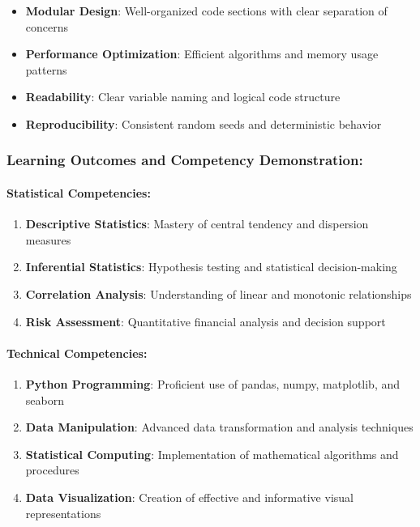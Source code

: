 \documentclass[11pt]{article}
\providecommand{\tightlist}{%
      \setlength{\itemsep}{0pt}\setlength{\parskip}{0pt}}
\begin{document}
\begin{itemize}
\tightlist
\item
  \textbf{Modular Design}: Well-organized code sections with clear
  separation of concerns
\item
  \textbf{Performance Optimization}: Efficient algorithms and memory
  usage patterns
\item
  \textbf{Readability}: Clear variable naming and logical code structure
\item
  \textbf{Reproducibility}: Consistent random seeds and deterministic
  behavior
\end{itemize}

\subsubsection{\texorpdfstring{\textbf{Learning Outcomes and Competency
Demonstration:}}{Learning Outcomes and Competency Demonstration:}}\label{learning-outcomes-and-competency-demonstration}

\paragraph{\texorpdfstring{\textbf{Statistical
Competencies:}}{Statistical Competencies:}}\label{statistical-competencies}

\begin{enumerate}
\def\labelenumi{\arabic{enumi}.}
\tightlist
\item
  \textbf{Descriptive Statistics}: Mastery of central tendency and
  dispersion measures
\item
  \textbf{Inferential Statistics}: Hypothesis testing and statistical
  decision-making
\item
  \textbf{Correlation Analysis}: Understanding of linear and monotonic
  relationships
\item
  \textbf{Risk Assessment}: Quantitative financial analysis and decision
  support
\end{enumerate}

\paragraph{\texorpdfstring{\textbf{Technical
Competencies:}}{Technical Competencies:}}\label{technical-competencies}

\begin{enumerate}
\def\labelenumi{\arabic{enumi}.}
\tightlist
\item
  \textbf{Python Programming}: Proficient use of pandas, numpy,
  matplotlib, and seaborn
\item
  \textbf{Data Manipulation}: Advanced data transformation and analysis
  techniques
\item
  \textbf{Statistical Computing}: Implementation of mathematical
  algorithms and procedures
\item
  \textbf{Data Visualization}: Creation of effective and informative
  visual representations
\end{enumerate}
\end{document}
